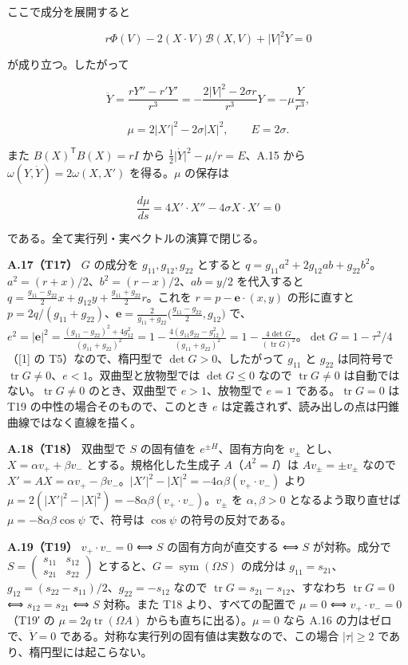 \documentclass[
  a4paper,
]{ltjsarticle}
\begin{document}
ここで成分を展開すると

\[
r\Phi(V)-2(X\cdot V)\mathcal B(X,V)+\lvert V\rvert^2Y=0
\]

が成り立つ。したがって

\[
\ddot Y=\frac{rY''-r'Y'}{r^3}
=-\frac{2\lvert V\rvert^2-2\sigma r}{r^3}Y
=-\mu\frac{Y}{r^3},
\]

\[
\mu=2\lvert X'\rvert^2-2\sigma\lvert X\rvert^2,
\qquad E=2\sigma.
\]

また \(B(X)^{\mathsf T}B(X)=rI\) から
\(\frac12\lvert\dot Y\rvert^2-\mu/r=E\)、A.15 から
\(\omega(Y,\dot Y)=2\omega(X,X')\) を得る。\(\mu\) の保存は

\[
\frac{d\mu}{ds}=4X'\cdot X''-4\sigma X\cdot X'=0
\]

である。全て実行列・実ベクトルの演算で閉じる。

\textbf{A.17（T17）} \(G\) の成分を \(g_{11},g_{12},g_{22}\) とすると
\(q=g_{11}a^2+2g_{12}ab+g_{22}b^2\)。\(a^2=(r+x)/2\)、\(b^2=(r-x)/2\)、\(ab=y/2\)
を代入すると
\(q=\frac{g_{11}-g_{22}}{2}x+g_{12}y+\frac{g_{11}+g_{22}}{2}r\)。これを
\(r=p-\mathbf e\cdot(x,y)\) の形に直すと
\(p=2q/(g_{11}+g_{22})\)、\(\mathbf e=\frac{2}{g_{11}+g_{22}}\bigl(\frac{g_{11}-g_{22}}{2},g_{12}\bigr)\)
で、\(e^2=\lvert\mathbf e\rvert^2=\frac{(g_{11}-g_{22})^2+4g_{12}^2}{(g_{11}+g_{22})^2}=1-\frac{4(g_{11}g_{22}-g_{12}^2)}{(g_{11}+g_{22})^2}=1-\frac{4\det G}{(\operatorname{tr}G)^2}\)。\(\det G=1-\tau^2/4\)（{[}1{]}
の T5）なので、楕円型で \(\det G>0\)、したがって \(g_{11}\) と
\(g_{22}\) は同符号で
\(\operatorname{tr}G\neq0\)、\(e<1\)。双曲型と放物型では \(\det G\le0\)
なので \(\operatorname{tr}G\neq0\)
は自動ではない。\(\operatorname{tr}G\neq0\) のとき、双曲型で
\(e>1\)、放物型で \(e=1\) である。\(\operatorname{tr}G=0\) は T19
の中性の場合そのもので、このとき \(e\)
は定義されず、読み出しの点は円錐曲線ではなく直線を描く。

\textbf{A.18（T18）} 双曲型で \(S\) の固有値を \(e^{\pm H}\)、固有方向を
\(v_\pm\) とし、\(X=\alpha v_++\beta v_-\) とする。規格化した生成子
\(A\)（\(A^2=I\)）は \(Av_\pm=\pm v_\pm\) なので
\(X'=AX=\alpha v_+-\beta v_-\)。\(\lvert X'\rvert^2-\lvert X\rvert^2=-4\alpha\beta(v_+\!\cdot v_-)\)
より
\(\mu=2(\lvert X'\rvert^2-\lvert X\rvert^2)=-8\alpha\beta(v_+\!\cdot v_-)\)。\(v_\pm\)
を \(\alpha,\beta>0\) となるよう取り直せば \(\mu=-8\alpha\beta\cos\psi\)
で、符号は \(\cos\psi\) の符号の反対である。

\textbf{A.19（T19）} \(v_+\!\cdot v_-=0\) ⟺ \(S\) の固有方向が直交する ⟺
\(S\) が対称。成分で
\(S=\begin{pmatrix}s_{11}&s_{12}\\s_{21}&s_{22}\end{pmatrix}\)
とすると、\(G=\operatorname{sym}(\Omega S)\) の成分は
\(g_{11}=s_{21}\)、\(g_{12}=(s_{22}-s_{11})/2\)、\(g_{22}=-s_{12}\)
なので \(\operatorname{tr}G=s_{21}-s_{12}\)、すなわち
\(\operatorname{tr}G=0\) ⟺ \(s_{12}=s_{21}\) ⟺ \(S\) 対称。また T18
より、すべての配置で \(\mu=0\) ⟺ \(v_+\!\cdot v_-=0\)（T19′ の
\(\mu=2q\operatorname{tr}(\Omega A)\) からも直ちに出る）。\(\mu=0\) なら
A.16 の力はゼロで、\(\ddot Y=0\)
である。対称な実行列の固有値は実数なので、この場合
\(\lvert\tau\rvert\ge2\) であり、楕円型には起こらない。
\end{document}
